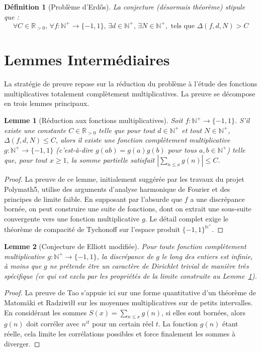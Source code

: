 \documentclass[12pt,a4paper]{article}
\newtheorem{lemma}{Lemme}
\newtheorem{definition}{Définition}
\begin{document}
\begin{definition}[Problème d'Erdős]
La conjecture (désormais théorème) stipule que :
\begin{equation}
\forall C \in \mathbb{R}_{>0}, \, \forall f : \mathbb{N}^+ \to \{-1, 1\}, \, \exists d \in \mathbb{N}^+, \, \exists N \in \mathbb{N}^+, \text{ tels que } \Delta(f, d, N) > C
\end{equation}
\end{definition}

\section{Lemmes Intermédiaires}

La stratégie de preuve repose sur la réduction du problème à l'étude des fonctions multiplicatives totalement complètement multiplicatives. La preuve se décompose en trois lemmes principaux.

\begin{lemma}[Réduction aux fonctions multiplicatives]
\label{lem:reduction}
Soit $f : \mathbb{N}^+ \to \{-1, 1\}$. S'il existe une constante $C \in \mathbb{R}_{>0}$ telle que pour tout $d \in \mathbb{N}^+$ et tout $N \in \mathbb{N}^+$, $\Delta(f, d, N) \leq C$, alors il existe une fonction complètement multiplicative $g : \mathbb{N}^+ \to \{-1, 1\}$ (c'est-à-dire $g(ab) = g(a)g(b)$ pour tous $a, b \in \mathbb{N}^+$) telle que, pour tout $x \geq 1$, la somme partielle satisfait $\left| \sum_{n \leq x} g(n) \right| \leq C$.
\end{lemma}
\begin{proof}
La preuve de ce lemme, initialement suggérée par les travaux du projet Polymath5, utilise des arguments d'analyse harmonique de Fourier et des principes de limite faible. En supposant par l'absurde que $f$ a une discrépance bornée, on peut construire une suite de fonctions, dont on extrait une sous-suite convergente vers une fonction multiplicative $g$. Le détail complet exige le théorème de compacité de Tychonoff sur l'espace produit $\{-1, 1\}^{\mathbb{N}^+}$.
\end{proof}

\begin{lemma}[Conjecture de Elliott modifiée]
\label{lem:elliott}
Pour toute fonction complètement multiplicative $g : \mathbb{N}^+ \to \{-1, 1\}$, la discrépance de $g$ le long des entiers est infinie, à moins que $g$ ne prétende être un caractère de Dirichlet trivial de manière très spécifique (ce qui est exclu par les propriétés de la limite construite au Lemme~\ref{lem:reduction}).
\end{lemma}
\begin{proof}
La preuve de Tao s'appuie ici sur une forme quantitative d'un théorème de Matomäki et Radziwiłł sur les moyennes multiplicatives sur de petits intervalles. En considérant les sommes $S(x) = \sum_{n \leq x} g(n)$, si elles sont bornées, alors $g(n)$ doit corréler avec $n^{it}$ pour un certain réel $t$. La fonction $g(n)$ étant réelle, cela limite les corrélations possibles et force finalement les sommes à diverger.
\end{proof}
\end{document}
